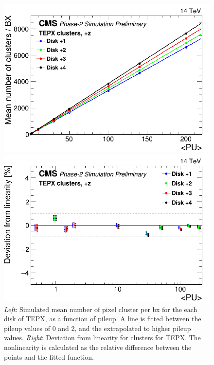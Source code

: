 \begin{center}
    \begin{figure}[H]
\begin{minipage}[b]{0.5\linewidth}
        \centering
        \includegraphics[scale=0.25]{Chapter4/plots/TEPX_totalcluster_linearity.png}
\end{minipage}
\begin{minipage}[b]{0.5\linewidth}
        \centering
        \includegraphics[scale=0.25]{Chapter4/plots/TEPX_totalcluster_residuals.png}
\end{minipage}
    \caption[Linearity of TEPX for pixel clusters.]{\textit{Left}: Simulated mean number of pixel cluster per bx for the each disk of TEPX, as a function of pileup. A line is fitted between the pileup values of 0 and 2, and the extrapolated to higher pileup values. \textit{Right}: Deviation from linearity for clusters for TEPX. The nonlinearity is calculated as the relative difference between the points and the fitted function.  }
    \label{lin1}
\end{figure}
\end{center}
